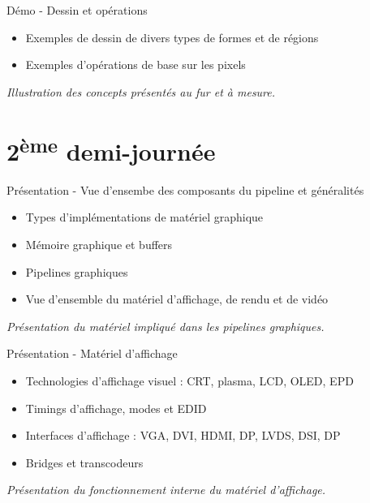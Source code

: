 \documentclass[a4paper,12pt,obeyspaces,spaces,hyphens]{article}
\begin{document}
{Démo - Dessin et opérations}
{
  \begin{itemize}
  \item Exemples de dessin de divers types de formes et de régions
  \item Exemples d'opérations de base sur les pixels
  \end{itemize}
  \vspace{0.5em}
  {\em Illustration des concepts présentés au fur et à mesure.}
}

\section{2\textsuperscript{ème} demi-journée}

\feagendatwocolumn
{Présentation - Vue d'ensembe des composants du pipeline et généralités}
{
  \begin{itemize}
  \item Types d'implémentations de matériel graphique
  \item Mémoire graphique et buffers
  \item Pipelines graphiques
  \item Vue d'ensemble du matériel d'affichage, de rendu et de vidéo
  \end{itemize}
  \vspace{0.5em}
  {\em Présentation du matériel impliqué dans les pipelines graphiques.}
}
{Présentation - Matériel d'affichage}
{
  \begin{itemize}
  \item Technologies d'affichage visuel : CRT, plasma, LCD, OLED, EPD
  \item Timings d'affichage, modes et EDID
  \item Interfaces d'affichage : VGA, DVI, HDMI, DP, LVDS, DSI, DP
  \item Bridges et transcodeurs
  \end{itemize}
  \vspace{0.5em}
  {\em Présentation du fonctionnement interne du matériel d'affichage.}
}
\\
\end{document}
